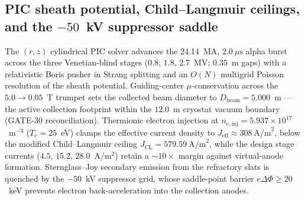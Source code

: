 \subsection{PIC sheath potential, Child--Langmuir ceilings, and the
$-50$~kV suppressor saddle}
\label{subsec:pic_sheath}

The $(r,z)$ cylindrical PIC solver advances the 24.14~MA,
$2.0~\mu\text{s}$ alpha burst across the three Venetian-blind stages
($0.8$, $1.8$, $2.7$~MV; $0.35$~m gaps) with a relativistic Boris pusher
in Strang splitting and an $O(N)$ multigrid Poisson resolution of the
sheath potential.  Guiding-center $\mu$-conservation across the
$5.0 \to 0.05$~T trumpet sets the collected beam diameter to
$D_{\text{beam}} = 5.000$~m --- the active collection footprint within
the $12.0$~m cryostat vacuum boundary (GATE-30 reconciliation).
Thermionic electron injection at $n_{e,\text{inj}} = 5.937 \times
10^{17}$~m$^{-3}$ ($T_e = 25$~eV) clamps the effective current density
to $J_{\text{eff}} \approx 308~\text{A/m}^2$, below the modified
Child--Langmuir ceiling $J_{\text{CL}} = 579.59~\text{A/m}^2$, while the
design stage currents ($4.5$, $15.2$, $28.0$~A/m$^2$) retain a
$\sim 10\times$ margin against virtual-anode formation.  Sternglass--Joy
secondary emission from the refractory slats is quenched by the
$-50$~kV suppressor grid, whose saddle-point barrier
$e\Delta\Phi \ge 20$~keV prevents electron back-acceleration into the
collection anodes.
